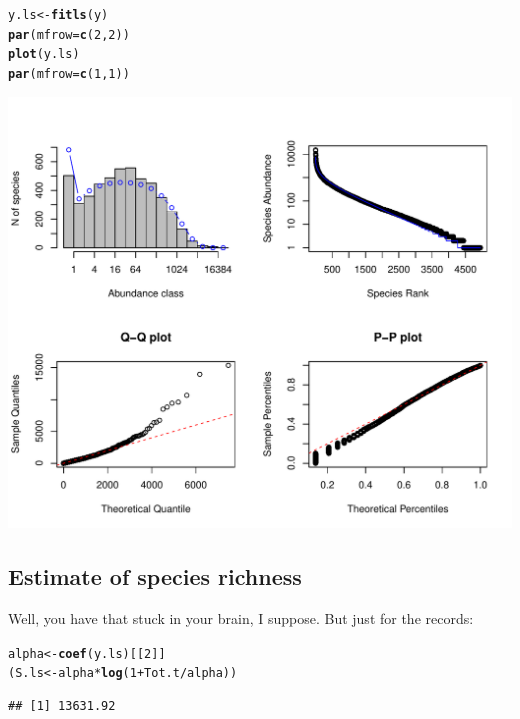 \documentclass[12pt, A4]{article}\usepackage[]{graphicx}\usepackage[]{color}
\makeatletter
\def\maxwidth{ %
  \ifdim\Gin@nat@width>\linewidth
    \linewidth
  \else
    \Gin@nat@width
  \fi
}
\newcommand{\hlnum}[1]{\textcolor[rgb]{0.686,0.059,0.569}{#1}}%
\newcommand{\hlopt}[1]{\textcolor[rgb]{0,0,0}{#1}}%
\newcommand{\hlstd}[1]{\textcolor[rgb]{0.345,0.345,0.345}{#1}}%
\newcommand{\hlkwb}[1]{\textcolor[rgb]{0.69,0.353,0.396}{#1}}%
\newcommand{\hlkwc}[1]{\textcolor[rgb]{0.333,0.667,0.333}{#1}}%
\newcommand{\hlkwd}[1]{\textcolor[rgb]{0.737,0.353,0.396}{\textbf{#1}}}%
\newenvironment{kframe}{%
 \def\at@end@of@kframe{}%
 \ifinner\ifhmode%
  \def\at@end@of@kframe{\end{minipage}}%
  \begin{minipage}{\columnwidth}%
 \fi\fi%
 \def\FrameCommand##1{\hskip\@totalleftmargin \hskip-\fboxsep
 \colorbox{shadecolor}{##1}\hskip-\fboxsep
     \hskip-\linewidth \hskip-\@totalleftmargin \hskip\columnwidth}%
 \MakeFramed {\advance\hsize-\width
   \@totalleftmargin\z@ \linewidth\hsize
   \@setminipage}}%
 {\par\unskip\endMakeFramed%
 \at@end@of@kframe}
\newenvironment{knitrout}{}{} %
\makeatother
\begin{document}
 
\begin{knitrout}
\color{fgcolor}\begin{kframe}
\begin{alltt}
\hlstd{y.ls} \hlkwb{<-} \hlkwd{fitls}\hlstd{(y)}
\hlkwd{par}\hlstd{(}\hlkwc{mfrow}\hlstd{=}\hlkwd{c}\hlstd{(}\hlnum{2}\hlstd{,}\hlnum{2}\hlstd{))}
\hlkwd{plot}\hlstd{(y.ls)}
\hlkwd{par}\hlstd{(}\hlkwc{mfrow}\hlstd{=}\hlkwd{c}\hlstd{(}\hlnum{1}\hlstd{,}\hlnum{1}\hlstd{))}
\end{alltt}
\end{kframe}

{\centering \includegraphics[width=\maxwidth]{figure/fit_ls-1} 

}



\end{knitrout}

\subsection*{Estimate of species richness}

Well, you have that stuck in your brain, I suppose. 
But just for the records:

 
\begin{knitrout}
\color{fgcolor}\begin{kframe}
\begin{alltt}
\hlstd{alpha} \hlkwb{<-} \hlkwd{coef}\hlstd{(y.ls)[[}\hlnum{2}\hlstd{]]}
\hlstd{(S.ls} \hlkwb{<-} \hlstd{alpha}\hlopt{*}\hlkwd{log}\hlstd{(}\hlnum{1} \hlopt{+} \hlstd{Tot.t}\hlopt{/}\hlstd{alpha))}
\end{alltt}
\begin{verbatim}
## [1] 13631.92
\end{verbatim}
\end{kframe}
\end{knitrout}
\end{document}
